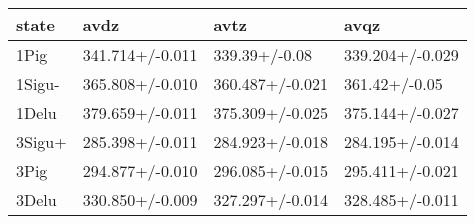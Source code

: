 \begin{tabular}{llll}
\toprule
state & avdz & avtz & avqz \\
\midrule
1Pig & 341.714+/-0.011 & 339.39+/-0.08 & 339.204+/-0.029 \\
1Sigu- & 365.808+/-0.010 & 360.487+/-0.021 & 361.42+/-0.05 \\
1Delu & 379.659+/-0.011 & 375.309+/-0.025 & 375.144+/-0.027 \\
3Sigu+ & 285.398+/-0.011 & 284.923+/-0.018 & 284.195+/-0.014 \\
3Pig & 294.877+/-0.010 & 296.085+/-0.015 & 295.411+/-0.021 \\
3Delu & 330.850+/-0.009 & 327.297+/-0.014 & 328.485+/-0.011 \\
\bottomrule
\end{tabular}

